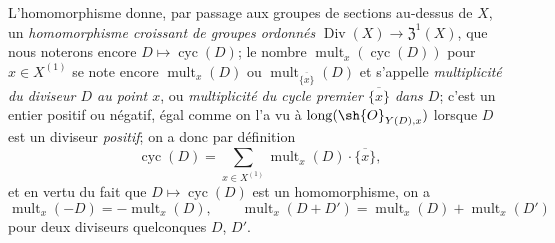 \begin{env}[21.6.7]
L'homomorphisme  donne, par passage aux groupes de sections au-dessus de $X$, un \emph{homomorphisme croissant de groupes ordonnés} $\operatorname{Div}(X)\to\mathfrak{Z}^1(X)$, que nous noterons encore $D\mapsto\operatorname{cyc}(D)$;
le nombre $\operatorname{mult}_x(\operatorname{cyc}(D))$ pour $x\in X^{(1)}$ se note encore $\operatorname{mult}_x(D)$ ou $\operatorname{mult}_{\overline{\{x\}}}(D)$ et s'appelle \emph{multiplicité du diviseur $D$ au point $x$}, ou \emph{multiplicité du cycle premier $\overline{\{x\}}$ dans $D$};
c'est un entier positif ou négatif, égal comme on l'a vu à $\operatorname{long}(\sh{O}_{Y(D),x})$ lorsque $D$ est un diviseur \emph{positif};
on a donc par définition
\[
\label{IV.21.6.7.1}
  \operatorname{cyc}(D)=\sum_{x\in X^{(1)}}\operatorname{mult}_x(D)\cdot\overline{\{x\}},
  \tag{21.6.7.1}
\]
et en vertu du fait que $D\mapsto\operatorname{cyc}(D)$ est un homomorphisme, on a
\[
\label{IV.21.6.7.2}
  \operatorname{mult}_x(-D)=-\operatorname{mult}_x(D),\qquad
  \operatorname{mult}_x(D+D')=\operatorname{mult}_x(D)+\operatorname{mult}_x(D')
  \tag{21.6.7.2}
\]
pour deux diviseurs quelconques $D$, $D'$.


\end{env}
